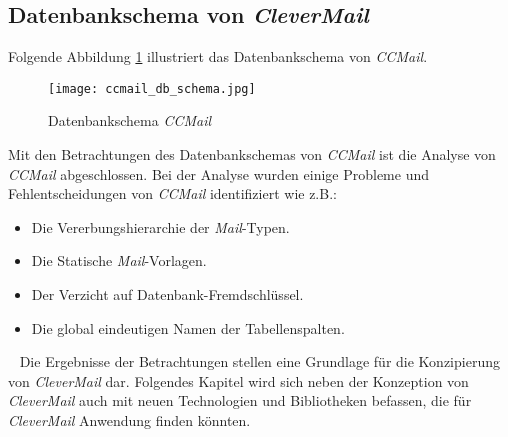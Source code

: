 \subsection{Datenbankschema von \emph{CleverMail}}
Folgende Abbildung \ref{fig:ccmail-db-schema} illustriert das Datenbankschema von \emph{CCMail}.
\begin{figure}[H]
\centering
\texttt{[image: ccmail\_db\_schema.jpg]} 
\caption{Datenbankschema \emph{CCMail}}
\label{fig:ccmail-db-schema}
\end{figure}
Mit den Betrachtungen des Datenbankschemas von \emph{CCMail} ist die Analyse von \emph{CCMail} abgeschlossen. Bei der Analyse wurden einige Probleme und Fehlentscheidungen von \emph{CCMail} identifiziert wie z.B.:
\begin{itemize}
	\item Die Vererbungshierarchie der \emph{Mail}-Typen.
	\item Die Statische \emph{Mail}-Vorlagen.
	\item Der Verzicht auf Datenbank-Fremdschlüssel.
	\item Die global eindeutigen Namen der Tabellenspalten.
\end{itemize}
\ \newline
Die Ergebnisse der Betrachtungen stellen eine Grundlage für die Konzipierung von \emph{CleverMail} dar. Folgendes Kapitel wird sich neben der Konzeption von \emph{CleverMail} auch mit neuen Technologien und Bibliotheken befassen, die für \emph{CleverMail} Anwendung finden könnten. 